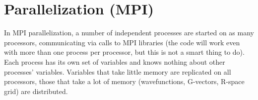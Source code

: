 \documentclass[12pt,a4paper]{article}
\begin{document}



\section{Parallelization (MPI)}

In MPI parallelization, a number of independent processes are started
on as many processors, communicating via calls to MPI libraries
(the code will work even with more than one process per processor,
but this is not a smart thing to do). Each process has its own
set of variables and knows nothing about other processes' variables.
Variables that take little memory are replicated on all processors,
those that take a lot of memory (wavefunctions, G-vectors, R-space grid)
are distributed.
\end{document}

